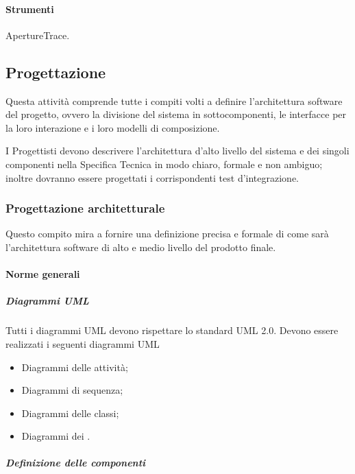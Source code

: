 \paragraph{Strumenti}
ApertureTrace.



\subsection{Progettazione}
Questa attività comprende tutte i compiti volti a definire l'architettura software del progetto, ovvero la divisione del sistema in sottocomponenti, le interfacce per la loro interazione e i loro modelli di composizione. %


I Progettisti devono descrivere l'architettura d'alto livello del sistema e dei singoli componenti nella Specifica Tecnica in modo chiaro, formale e non ambiguo; inoltre dovranno essere progettati i corrispondenti test d'integrazione.



\subsubsection{Progettazione architetturale}
\label{prog_arch}
Questo compito mira a fornire una definizione precisa e formale di come sarà l'architettura software di alto e medio livello del prodotto finale.

\paragraph{Norme generali}


\subparagraph{Diagrammi UML}

Tutti i diagrammi UML devono rispettare lo standard UML 2.0.
Devono essere realizzati i seguenti diagrammi UML
\begin{itemize}
\item Diagrammi delle attività;
\item Diagrammi di sequenza;
\item Diagrammi delle classi;
\item Diagrammi dei .
\end{itemize}

\subparagraph{Definizione delle componenti}

